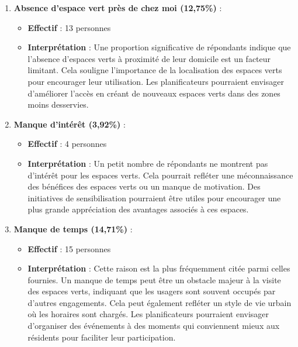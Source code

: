 \documentclass[
]{article}
\providecommand{\tightlist}{%
  \setlength{\itemsep}{0pt}\setlength{\parskip}{0pt}}
\begin{document}
\begin{enumerate}
\def\labelenumi{\arabic{enumi}.}
\tightlist
\item
  \textbf{Absence d'espace vert près de chez moi (12,75\%)} :

  \begin{itemize}
  \tightlist
  \item
    \textbf{Effectif} : 13 personnes
  \item
    \textbf{Interprétation} : Une proportion significative de répondants
    indique que l'absence d'espaces verts à proximité de leur domicile
    est un facteur limitant. Cela souligne l'importance de la
    localisation des espaces verts pour encourager leur utilisation. Les
    planificateurs pourraient envisager d'améliorer l'accès en créant de
    nouveaux espaces verts dans des zones moins desservies.
  \end{itemize}
\item
  \textbf{Manque d'intérêt (3,92\%)} :

  \begin{itemize}
  \tightlist
  \item
    \textbf{Effectif} : 4 personnes
  \item
    \textbf{Interprétation} : Un petit nombre de répondants ne montrent
    pas d'intérêt pour les espaces verts. Cela pourrait refléter une
    méconnaissance des bénéfices des espaces verts ou un manque de
    motivation. Des initiatives de sensibilisation pourraient être
    utiles pour encourager une plus grande appréciation des avantages
    associés à ces espaces.
  \end{itemize}
\item
  \textbf{Manque de temps (14,71\%)} :

  \begin{itemize}
  \tightlist
  \item
    \textbf{Effectif} : 15 personnes
  \item
    \textbf{Interprétation} : Cette raison est la plus fréquemment citée
    parmi celles fournies. Un manque de temps peut être un obstacle
    majeur à la visite des espaces verts, indiquant que les usagers sont
    souvent occupés par d'autres engagements. Cela peut également
    refléter un style de vie urbain où les horaires sont chargés. Les
    planificateurs pourraient envisager d'organiser des événements à des
    moments qui conviennent mieux aux résidents pour faciliter leur
    participation.
  \end{itemize}
\end{enumerate}
\end{document}
